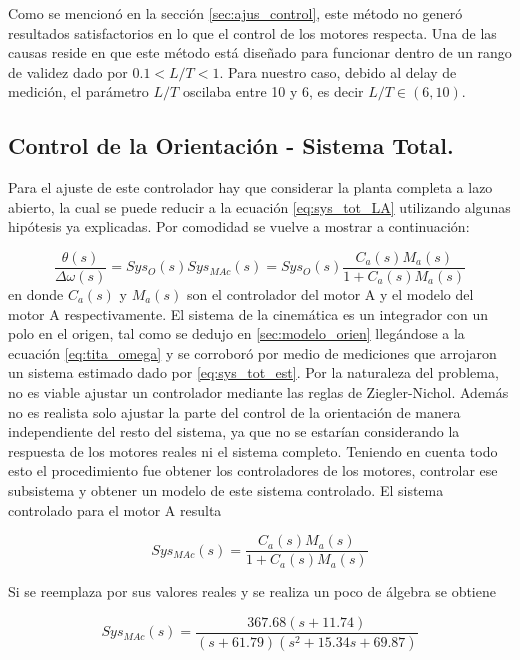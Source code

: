 \documentclass[10pt,conference,a4paper,onecolumn]{article}%
\begin{document}
Como se mencionó en la sección \ref{sec:ajus_control}, este método no generó resultados satisfactorios en lo que el control de los motores respecta. Una de las causas reside en que este método está diseñado para funcionar dentro de un rango de validez \cite[pág. 60]{biblia_PID} dado por $0.1<L/T<1$. Para nuestro caso, debido al delay de medición, el parámetro $L/T$ oscilaba entre 10 y 6, es decir $L/T \in (6,10) $. 
\subsection{Control de la Orientación - Sistema Total.}

Para el ajuste de este controlador hay que considerar la planta completa a lazo abierto, la cual se puede reducir a la ecuación \ref{eq:sys_tot_LA} utilizando algunas hipótesis ya explicadas. Por comodidad se vuelve a  mostrar a continuación:

\begin{equation*}
\frac{\theta(s)}{\Delta \omega (s)}=Sys_O(s)Sys_{MAc}(s)=Sys_O(s)\frac{C_a(s)M_a(s)}{1+C_a(s)M_a(s)}
\end{equation*}
en donde $C_a(s)$ y $M_a(s)$ son el controlador del motor A y el modelo del motor A respectivamente.
El sistema de la cinemática es un integrador con un polo en el origen, tal como se dedujo en \ref{sec:modelo_orien} llegándose a la ecuación \ref{eq:tita_omega} y se corroboró por medio de mediciones que arrojaron un sistema estimado dado por \ref{eq:sys_tot_est}. Por la naturaleza del problema, no es viable ajustar un controlador mediante las reglas de Ziegler-Nichol. Además no es realista solo ajustar la parte del control de la orientación de manera independiente del resto del sistema, ya que no se estarían considerando la respuesta de los motores reales ni el sistema completo. Teniendo en cuenta todo esto el procedimiento fue obtener los controladores de los motores, controlar ese subsistema y obtener un modelo de este sistema controlado. El sistema controlado para el motor A resulta

\begin{equation}
Sys_{MAc}(s)=\frac{C_a(s)M_a(s)}{1+C_a(s)M_a(s)}
\end{equation}    

Si se reemplaza por sus valores reales y se realiza un poco de álgebra se obtiene

\begin{equation}
Sys_{MAc}(s)=\frac{367.68(s+11.74)}{(s+61.79) (s^2 + 15.34s + 69.87)}
\end{equation}
\end{document}
